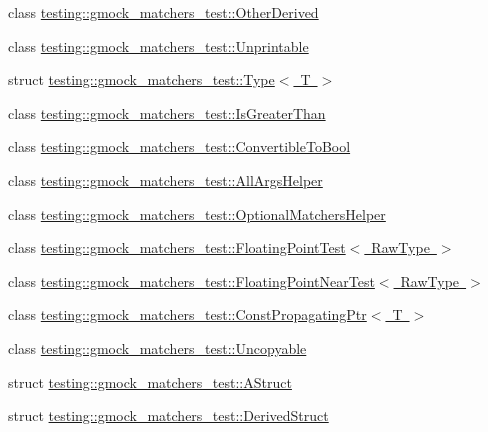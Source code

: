 \begin{DoxyCompactItemize}
\item 
class \mbox{\hyperlink{classtesting_1_1gmock__matchers__test_1_1OtherDerived}{testing\+::gmock\+\_\+matchers\+\_\+test\+::\+Other\+Derived}}
\item 
class \mbox{\hyperlink{classtesting_1_1gmock__matchers__test_1_1Unprintable}{testing\+::gmock\+\_\+matchers\+\_\+test\+::\+Unprintable}}
\item 
struct \mbox{\hyperlink{structtesting_1_1gmock__matchers__test_1_1Type}{testing\+::gmock\+\_\+matchers\+\_\+test\+::\+Type$<$ T $>$}}
\item 
class \mbox{\hyperlink{classtesting_1_1gmock__matchers__test_1_1IsGreaterThan}{testing\+::gmock\+\_\+matchers\+\_\+test\+::\+Is\+Greater\+Than}}
\item 
class \mbox{\hyperlink{classtesting_1_1gmock__matchers__test_1_1ConvertibleToBool}{testing\+::gmock\+\_\+matchers\+\_\+test\+::\+Convertible\+To\+Bool}}
\item 
class \mbox{\hyperlink{classtesting_1_1gmock__matchers__test_1_1AllArgsHelper}{testing\+::gmock\+\_\+matchers\+\_\+test\+::\+All\+Args\+Helper}}
\item 
class \mbox{\hyperlink{classtesting_1_1gmock__matchers__test_1_1OptionalMatchersHelper}{testing\+::gmock\+\_\+matchers\+\_\+test\+::\+Optional\+Matchers\+Helper}}
\item 
class \mbox{\hyperlink{classtesting_1_1gmock__matchers__test_1_1FloatingPointTest}{testing\+::gmock\+\_\+matchers\+\_\+test\+::\+Floating\+Point\+Test$<$ Raw\+Type $>$}}
\item 
class \mbox{\hyperlink{classtesting_1_1gmock__matchers__test_1_1FloatingPointNearTest}{testing\+::gmock\+\_\+matchers\+\_\+test\+::\+Floating\+Point\+Near\+Test$<$ Raw\+Type $>$}}
\item 
class \mbox{\hyperlink{classtesting_1_1gmock__matchers__test_1_1ConstPropagatingPtr}{testing\+::gmock\+\_\+matchers\+\_\+test\+::\+Const\+Propagating\+Ptr$<$ T $>$}}
\item 
class \mbox{\hyperlink{classtesting_1_1gmock__matchers__test_1_1Uncopyable}{testing\+::gmock\+\_\+matchers\+\_\+test\+::\+Uncopyable}}
\item 
struct \mbox{\hyperlink{structtesting_1_1gmock__matchers__test_1_1AStruct}{testing\+::gmock\+\_\+matchers\+\_\+test\+::\+A\+Struct}}
\item 
struct \mbox{\hyperlink{structtesting_1_1gmock__matchers__test_1_1DerivedStruct}{testing\+::gmock\+\_\+matchers\+\_\+test\+::\+Derived\+Struct}}
\item 

\end{DoxyCompactItemize}
